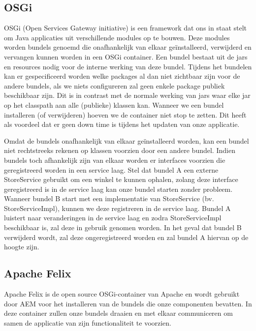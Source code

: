 \documentclass{article}
\begin{document}
	\subsection{OSGi}
	OSGi (Open Services Gateway initiative) is een framework dat ons in staat stelt om Java applicaties uit verschillende modules op te bouwen. Deze modules worden bundels genoemd die onafhankelijk van elkaar ge\"installeerd, verwijderd en vervangen kunnen worden in een OSGi container. Een bundel bestaat uit de jars en resources nodig voor de interne werking van deze bundel. Tijdens het bundelen kan er gespecificeerd worden welke packages al dan niet zichtbaar zijn voor de andere bundels, als we niets configureren zal geen enkele package publiek beschikbaar zijn. Dit is in contrast met de normale werking van jars waar elke jar op het classpath aan alle (publieke) klassen kan. Wanneer we een bundel installeren (of verwijderen) hoeven we de container niet stop te zetten. Dit heeft als voordeel dat er geen down time is tijdens het updaten van onze applicatie.
	\par
	Omdat de bundels onafhankelijk van elkaar ge\"installeerd worden, kan een bundel niet rechtstreeks rekenen op klassen voorzien door een andere bundel. Indien bundels toch afhankelijk zijn van elkaar worden er interfaces voorzien die geregistreerd worden in een service laag. Stel dat bundel A een externe StoreService gebruikt om een winkel te kunnen ophalen, zolang deze interface geregistreerd is in de service laag kan onze bundel starten zonder probleem. Wanneer bundel B start met een implementatie van StoreService (bv. StoreServiceImpl), kunnen we deze registreren in de service laag. Bundel A luistert naar veranderingen in de service laag en zodra StoreServiceImpl beschikbaar is, zal deze in gebruik genomen worden. In het geval dat bundel B verwijderd wordt, zal deze ongeregistreerd worden en zal bundel A hiervan op de hoogte zijn.
	\subsection{Apache Felix}
	Apache Felix is de open source OSGi-container van Apache en wordt gebruikt door AEM voor het installeren van de bundels die onze componenten bevatten. In deze container zullen onze bundels draaien en met elkaar communiceren om samen de applicatie van zijn functionaliteit te voorzien.
\end{document}
